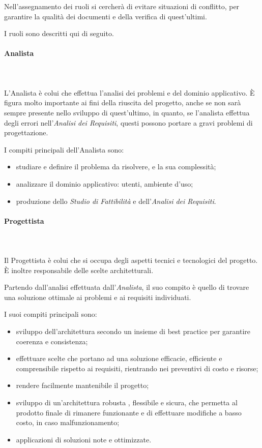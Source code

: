    			Nell'assegnamento dei ruoli si cercherà di evitare situazioni di conflitto, per garantire la qualità dei documenti e della verifica di quest'ultimi. 
   			
   			I ruoli sono descritti qui di seguito.
   			\paragraph{Analista} \mbox{}\\ \mbox{}\\
   				L'Analista è colui che effettua l'analisi dei problemi e del dominio applicativo. \`{E} figura molto importante ai fini della riuscita del progetto, anche se non sarà sempre presente nello sviluppo di quest'ultimo, in quanto, se l'analista effettua degli errori nell'\textit{Analisi dei Requisiti}, questi possono portare a gravi problemi di progettazione.
   				
   				I compiti principali dell'Analista sono:
   				\begin{itemize}
   					\item studiare e definire il problema da risolvere, e la sua complessità;
   					\item analizzare il dominio applicativo: utenti, ambiente d'uso;
   					\item produzione dello \textit{Studio di Fattibilità} e  dell'\textit{Analisi dei Requisiti}.
   				\end{itemize}
   			\paragraph{Progettista} \mbox{}\\ \mbox{}\\
   			Il Progettista è colui che si occupa degli aspetti tecnici e tecnologici del progetto. \`{E} inoltre responsabile delle scelte architetturali.
   			
   			Partendo dall'analisi effettuata dall'\textit{Analista}, il suo compito è quello di trovare una soluzione ottimale ai problemi e ai requisiti individuati.
   			
   			I suoi compiti principali sono:
   			\begin{itemize}
   				\item sviluppo dell'architettura secondo un insieme di best practice per garantire coerenza e consistenza;
   				\item effettuare scelte che portano ad una soluzione efficacie, efficiente e comprensibile rispetto ai requisiti, rientrando nei preventivi di costo e risorse;
   				\item rendere facilmente mantenibile il progetto;
   				\item sviluppo di un'architettura robusta , flessibile e sicura, che permetta al prodotto finale di rimanere funzionante e di effettuare modifiche a basso costo, in caso malfunzionamento;
   				\item applicazioni di soluzioni note e ottimizzate.
   			\end{itemize}
